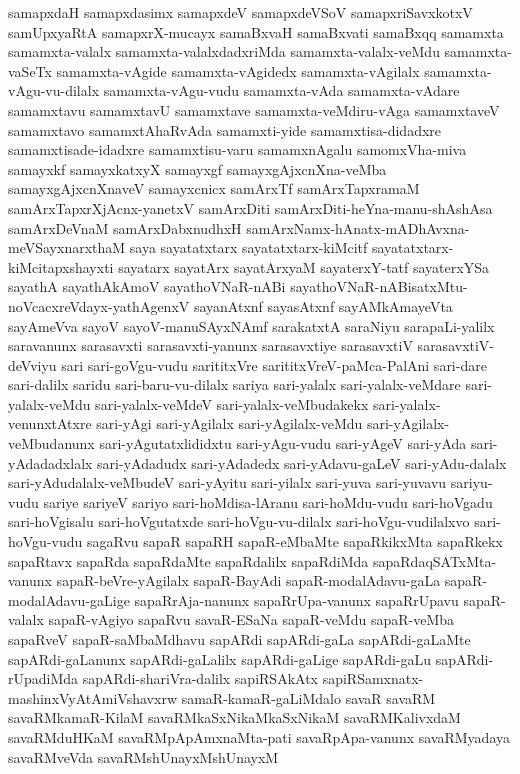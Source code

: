 {samapxdaH
samapxdasimx
samapxdeV
samapxdeVSoV
samapxriSavxkotxV
samUpxyaRtA
samapxrX-mucayx
samaBxvaH
samaBxvati
samaBxqq
samamxta
samamxta-valalx
samamxta-valalxdadxriMda
samamxta-valalx-veMdu
samamxta-vaSeTx
samamxta-vAgide
samamxta-vAgidedx
samamxta-vAgilalx
samamxta-vAgu-vu-dilalx
samamxta-vAgu-vudu
samamxta-vAda
samamxta-vAdare
samamxtavu
samamxtavU
samamxtave
samamxta-veMdiru-vAga
samamxtaveV
samamxtavo
samamxtAhaRvAda
samamxti-yide
samamxtisa-didadxre
samamxtisade-idadxre
samamxtisu-varu
samamxnAgalu
samomxVha-miva
samayxkf
samayxkatxyX
samayxgf
samayxgAjxcnXna-veMba
samayxgAjxcnXnaveV
samayxcnicx
samArxTf
samArxTapxramaM
samArxTapxrXjAcnx-yanetxV
samArxDiti
samArxDiti-heYna-manu-shAshAsa
samArxDeVnaM
samArxDabxnudhxH
samArxNamx-hAnatx-mADhAvxna-meVSayxnarxthaM
saya
sayatatxtarx
sayatatxtarx-kiMcitf
sayatatxtarx-kiMcitapxshayxti
sayatarx
sayatArx
sayatArxyaM
sayaterxY-tatf
sayaterxYSa
sayathA
sayathAkAmoV
sayathoVNaR-nABi
sayathoVNaR-nABisatxMtu-noVcacxreVdayx-yathAgenxV
sayanAtxnf
sayasAtxnf
sayAMkAmayeVta
sayAmeVva
sayoV
sayoV-manuSAyxNAmf
sarakatxtA
saraNiyu
sarapaLi-yalilx
saravanunx
sarasavxti
sarasavxti-yanunx
sarasavxtiye
sarasavxtiV
sarasavxtiV-deVviyu
sari
sari-goVgu-vudu
sarititxVre
sarititxVreV-paMca-PalAni
sari-dare
sari-dalilx
saridu
sari-baru-vu-dilalx
sariya
sari-yalalx
sari-yalalx-veMdare
sari-yalalx-veMdu
sari-yalalx-veMdeV
sari-yalalx-veMbudakekx
sari-yalalx-venunxtAtxre
sari-yAgi
sari-yAgilalx
sari-yAgilalx-veMdu
sari-yAgilalx-veMbudanunx
sari-yAgutatxlididxtu
sari-yAgu-vudu
sari-yAgeV
sari-yAda
sari-yAdadadxlalx
sari-yAdadudx
sari-yAdadedx
sari-yAdavu-gaLeV
sari-yAdu-dalalx
sari-yAdudalalx-veMbudeV
sari-yAyitu
sari-yilalx
sari-yuva
sari-yuvavu
sariyu-vudu
sariye
sariyeV
sariyo
sari-hoMdisa-lAranu
sari-hoMdu-vudu
sari-hoVgadu
sari-hoVgisalu
sari-hoVgutatxde
sari-hoVgu-vu-dilalx
sari-hoVgu-vudilalxvo
sari-hoVgu-vudu
sagaRvu
sapaR
sapaRH
sapaR-eMbaMte
sapaRkikxMta
sapaRkekx
sapaRtavx
sapaRda
sapaRdaMte
sapaRdalilx
sapaRdiMda
sapaRdaqSATxMta-vanunx
sapaR-beVre-yAgilalx
sapaR-BayAdi
sapaR-modalAdavu-gaLa
sapaR-modalAdavu-gaLige
sapaRrAja-nanunx
sapaRrUpa-vanunx
sapaRrUpavu
sapaR-valalx
sapaR-vAgiyo
sapaRvu
savaR-ESaNa
sapaR-veMdu
sapaR-veMba
sapaRveV
sapaR-saMbaMdhavu
sapARdi
sapARdi-gaLa
sapARdi-gaLaMte
sapARdi-gaLanunx
sapARdi-gaLalilx
sapARdi-gaLige
sapARdi-gaLu
sapARdi-rUpadiMda
sapARdi-shariVra-dalilx
sapiRSAkAtx
sapiRSamxnatx-mashinxVyAtAmiVshavxrw
samaR-kamaR-gaLiMdalo
savaR
savaRM
savaRMkamaR-KilaM
savaRMkaSxNikaMkaSxNikaM
savaRMKalivxdaM
savaRMduHKaM
savaRMpApAmxnaMta-pati
savaRpApa-vanunx
savaRMyadaya
savaRMveVda
savaRMshUnayxMshUnayxM
}
